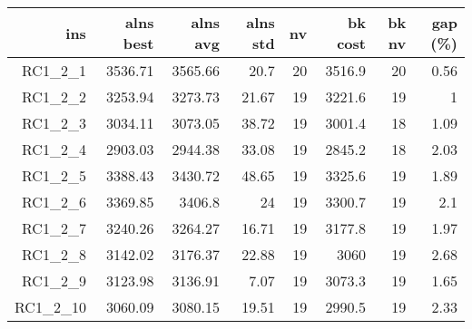   \begin{table}[caption={Kết quả đo với tập HG\_RC\_1\_2 200 yêu cầu}, label=exp:HGRC12]
    \centering
    \begin{tabular}{rrrrrrrr}
    \hline
    ins & alns best & alns avg & alns std & nv & bk cost & bk nv & gap (\%) \\ \hline
    RC1\_2\_1 & 3536.71 & 3565.66 & 20.7 & 20 & 3516.9 & 20 & 0.56 \\ \hline
    RC1\_2\_2 & 3253.94 & 3273.73 & 21.67 & 19 & 3221.6 & 19 & 1 \\ \hline
    RC1\_2\_3 & 3034.11 & 3073.05 & 38.72 & 19 & 3001.4 & 18 & 1.09 \\ \hline
    RC1\_2\_4 & 2903.03 & 2944.38 & 33.08 & 19 & 2845.2 & 18 & 2.03 \\ \hline
    RC1\_2\_5 & 3388.43 & 3430.72 & 48.65 & 19 & 3325.6 & 19 & 1.89 \\ \hline
    RC1\_2\_6 & 3369.85 & 3406.8 & 24 & 19 & 3300.7 & 19 & 2.1 \\ \hline
    RC1\_2\_7 & 3240.26 & 3264.27 & 16.71 & 19 & 3177.8 & 19 & 1.97 \\ \hline
    RC1\_2\_8 & 3142.02 & 3176.37 & 22.88 & 19 & 3060 & 19 & 2.68 \\ \hline
    RC1\_2\_9 & 3123.98 & 3136.91 & 7.07 & 19 & 3073.3 & 19 & 1.65 \\ \hline
    RC1\_2\_10 & 3060.09 & 3080.15 & 19.51 & 19 & 2990.5 & 19 & 2.33 \\ \hline
    \end{tabular}
  \end{table}

